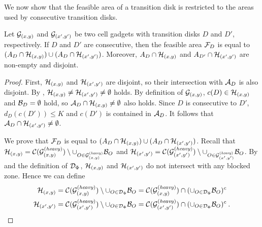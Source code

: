 \begin{toappendix}
\begin{toappendix}
We now show that the feasible area of a transition disk is restricted to the areas used by consecutive transition disks. %

\begin{mlemmarep}\label{lem:cg_two_subsets}
    Let $\mathcal{G}_{(x,y)}$ and $\mathcal{G}_{(x',y')}$ be two cell gadgets with transition disks $D$ and $D'$, respectively.
    If $D$ and $D'$ are consecutive, then the feasible area $\mathcal{F}_{D}$ is equal to $(A_D \cap \mathcal{H}_{(x,y)}) \cup (A_{D} \cap \mathcal{H}_{(x',y')})$.
    Moreover, $A_D \cap \mathcal{H}_{(x,y)}$ and $A_{D'} \cap \mathcal{H}_{(x',y')}$ are non-empty and disjoint.
\end{mlemmarep}
\begin{proof}
    First, $\mathcal{H}_{(x,y)}$ and $\mathcal{H}_{(x',y')}$ are disjoint, so their intersection with $\mathcal{A}_D$ is also disjoint.
    By , $\mathcal{H}_{(x,y)} \neq \mathcal{H}_{(x',y')} \neq \emptyset$ holds.
    By definition of $\mathcal{G}_{(x,y)}$, $c(D) \in \mathcal{H}_{(x,y)}$ and $\mathcal{B}_D = \emptyset$ hold, so $\mathcal{A}_D \cap \mathcal{H}_{(x,y)} \neq \emptyset$ also holds.
    Since $D$ is consecutive to $D'$, $d_D(c(D')) \le K$ and $c(D') $ is contained in $ \mathcal{A}_D$.
    It follows that $\mathcal{A}_D \cap \mathcal{H}_{(x',y')} \neq \emptyset$.

    We prove that $\mathcal{F}_{D}$ is equal to $(A_D \cap \mathcal{H}_{(x,y)}) \cup (A_{D} \cap \mathcal{H}_{(x',y')})$.
    Recall that $\mathcal{H}_{(x,y)} = \mathcal{C}(\mathcal{G}_{(x,y)}^{(\mathit{heavy})}) \setminus \cup_{O \in \mathcal{G}_{(x,y)}^{(\mathit{heavy})}} \mathcal{B}_{O}$ and $\mathcal{H}_{(x',y')} = \mathcal{C}(\mathcal{G}_{(x',y')}^{(\mathit{heavy})}) \setminus \cup_{O \in \mathcal{G}_{(x',y')}^{(\mathit{heavy})}} \mathcal{B}_{O}$. By  and the definition of $\mathcal{D}_\Phi$, $\mathcal{H}_{(x,y)}$ and $\mathcal{H}_{(x',y')}$ do not intersect with any blocked zone. Hence we can define
    \begin{align*}
        \mathcal{H}_{(x,y)} & = \mathcal{C}(\mathcal{G}_{(x,y)}^{(\mathit{heavy})}) \setminus \cup_{O \in \mathcal{D}_\Phi} \mathcal{B}_{O} = \mathcal{C}(\mathcal{G}_{(x,y)}^{(\mathit{heavy})}) \cap (\cup_{O \in \mathcal{D}_\Phi} \mathcal{B}_{O})^c\\
        \mathcal{H}_{(x',y')} & = \mathcal{C}(\mathcal{G}_{(x',y')}^{(\mathit{heavy})}) \setminus \cup_{O \in \mathcal{D}_\Phi} \mathcal{B}_{O} = \mathcal{C}(\mathcal{G}_{(x',y')}^{(\mathit{heavy})}) \cap (\cup_{O \in \mathcal{D}_\Phi} \mathcal{B}_{O})^c \:.
    \end{align*}
    

\end{proof}
\end{toappendix}
\end{toappendix}
